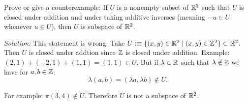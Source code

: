 \setcounter{xrcscount}{7}
\begin{xrcs}
  Prove or give a counterexample: If $U$ is a nonempty subset of $\mathbb{R}^2$ such that $U$ is closed under addition and under taking additive inverses (meaning $-u \in U$ whenever $u \in U$), then $U$ is subspace of $\mathbb{R}^2$.

  \emph{Solution:} This statement is wrong. Take $U :\equiv \{(x,y) \in \mathbb{R}^2 \mid (x,y) \in \mathbb{Z}^2 \} \subset \mathbb{R}^2$. Then $U$ is closed under addtion since $\mathbb{Z}$ is closed under addition. Example: $(2,1)+(-2,1)+(1,1) = (1,1) \in U$. But if $\lambda \in \mathbb{R}$ such that $\lambda \notin \mathbb{Z}$ we have for $a,b \in \mathbb{Z}$:
  \[
  \lambda(a,b) = (\lambda a, \lambda b) \notin U.
  \]

  For example: $\pi (3,4) \notin U$. Therefore $U$ is not a subspace of $\mathbb{R}^2$.
\end{xrcs}



